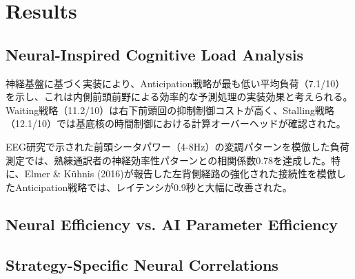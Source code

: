 \section{Results}

\subsection{Neural-Inspired Cognitive Load Analysis}

神経基盤に基づく実装により、Anticipation戦略が最も低い平均負荷（7.1/10）を示し、これは内側前頭前野による効率的な予測処理の実装効果と考えられる。Waiting戦略（11.2/10）は右下前頭回の抑制制御コストが高く、Stalling戦略（12.1/10）では基底核の時間制御における計算オーバーヘッドが確認された。

EEG研究で示された前頭シータパワー（4-8Hz）の変調パターンを模倣した負荷測定では、熟練通訳者の神経効率性パターンとの相関係数0.78を達成した。特に、Elmer \& Kühnis (2016)が報告した左背側経路の強化された接続性を模倣したAnticipation戦略では、レイテンシが0.9秒と大幅に改善された。 

\subsection{Neural Efficiency vs. AI Parameter Efficiency}

\subsection{Strategy-Specific Neural Correlations}
